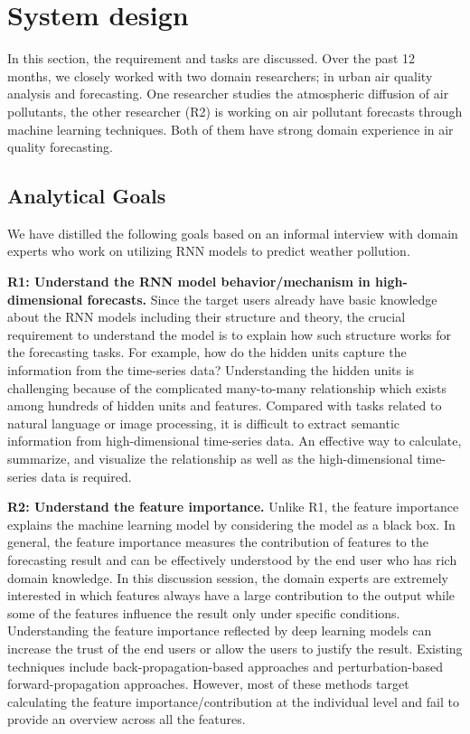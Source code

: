 \section{System design}
In this section, the requirement and tasks are discussed. Over the past 12 months, we closely worked with two domain researchers; in urban air quality analysis and forecasting. One researcher  studies the atmospheric diffusion of air pollutants, the other researcher (R2) is working on air pollutant forecasts through machine learning techniques. Both of them have strong domain experience in air quality forecasting. 



\subsection{Analytical  Goals}
We have distilled the following goals based on an informal interview with domain experts who work on utilizing RNN models to predict weather pollution. 

\textbf{R1: Understand the RNN model behavior/mechanism in high-dimensional forecasts.} 
Since the target users already have basic knowledge about the RNN models including their structure and theory, the crucial requirement to understand the model is to explain how such structure works for the forecasting tasks. 
For example, how do the hidden units capture the information from the time-series data? 
Understanding the hidden units is challenging because of the complicated many-to-many relationship which exists among hundreds of hidden units and features. 
Compared with tasks related to natural language or image processing, it is difficult to extract semantic information from  high-dimensional time-series data. 
An effective way to calculate, summarize, and visualize the relationship as well as the high-dimensional time-series data is required. 

\textbf{R2: Understand the feature importance.} 
Unlike R1, the feature importance explains the machine learning model by considering the model as a black box. 
In general, the feature importance measures the contribution of features to the forecasting result and can be effectively understood by the end user who has rich domain knowledge. 
In this discussion session, the domain experts are extremely interested in which features always have a large contribution to the output while some of the features influence the result only under specific conditions. 
Understanding the feature importance reflected by deep learning models can increase the trust of the end users or allow the users to justify the result.  
Existing techniques include back-propagation-based approaches and perturbation-based forward-propagation approaches. 
However, most of these methods target calculating the feature importance/contribution at the individual level and fail to provide an overview across all the features.  

